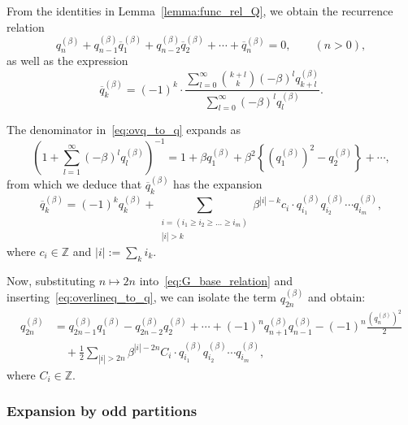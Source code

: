 \documentclass[dvipdfmx]{amsart}
\theoremstyle{definition}
\theoremstyle{remark}
\begin{document}
From the identities in Lemma~\ref{lemma:func_rel_Q}, we obtain the recurrence relation
\begin{equation}\label{eq:G_base_relation}
q_n^{(\beta)} + q_{n-1}^{(\beta)} \overline{q}_1^{(\beta)} + q_{n-2}^{(\beta)} \overline{q}_2^{(\beta)} + \cdots + \overline{q}_n^{(\beta)} = 0, \qquad (n > 0),
\end{equation}
as well as the expression
\begin{equation}\label{eq:ovq_to_q}
\overline{q}_k^{(\beta)} = (-1)^k \cdot \frac{
\sum_{l=0}^\infty \binom{k+l}{k} (-\beta)^l q_{k+l}^{(\beta)}
}{
\sum_{l=0}^\infty (-\beta)^l q_l^{(\beta)}
}.
\end{equation}

The denominator in~\eqref{eq:ovq_to_q} expands as
\begin{equation}\label{eq:q0_expansion}
\left(1 + \sum_{l=1}^\infty (-\beta)^l q_l^{(\beta)} \right)^{-1}
= 1 + \beta q_1^{(\beta)} + \beta^2\left\{(q_1^{(\beta)})^2 - q_2^{(\beta)}\right\} + \cdots,
\end{equation}
from which we deduce that \( \overline{q}_k^{(\beta)} \) has the expansion
\begin{equation}\label{eq:overlineq_to_q}
\overline{q}_k^{(\beta)} = (-1)^k q_k^{(\beta)} + \sum_{\substack{
i = (i_1 \geq i_2 \geq \dots \geq i_m) \\ |i| > k
}} \beta^{|i| - k} c_i \cdot q_{i_1}^{(\beta)} q_{i_2}^{(\beta)} \cdots q_{i_m}^{(\beta)},
\end{equation}
where \( c_i \in \mathbb{Z} \) and \( |i| := \sum_k i_k \).

Now, substituting \( n \mapsto 2n \) into~\eqref{eq:G_base_relation} and inserting~\eqref{eq:overlineq_to_q}, we can isolate the term \( q_{2n}^{(\beta)} \) and obtain:
\begin{equation}\label{eq:zenkasiki}
\begin{aligned}
q_{2n}^{(\beta)} &=
q_{2n-1}^{(\beta)} q_1^{(\beta)} - q_{2n-2}^{(\beta)} q_2^{(\beta)} + \cdots
+ (-1)^n q_{n+1}^{(\beta)} q_{n-1}^{(\beta)} - (-1)^n \frac{(q_n^{(\beta)})^2}{2} \\
& \quad + \frac{1}{2} \sum_{|i| > 2n} \beta^{|i| - 2n} C_i \cdot q_{i_1}^{(\beta)} q_{i_2}^{(\beta)} \cdots q_{i_m}^{(\beta)},
\end{aligned}
\end{equation}
where \( C_i \in \mathbb{Z} \).

\subsubsection{Expansion by odd partitions}\label{sec:expansion_by_odd}
\end{document}
